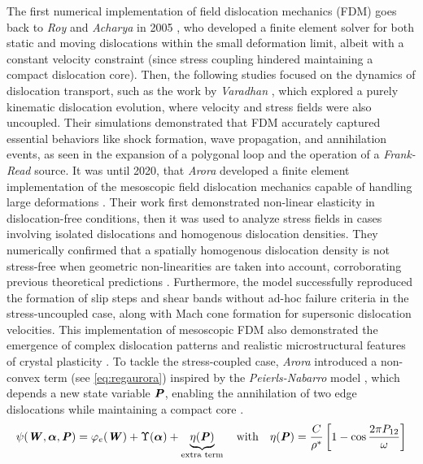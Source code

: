 \documentclass{article}
\begin{document}
The first numerical implementation of field dislocation mechanics (FDM) goes back to \emph{Roy} and \emph{Acharya} in 2005 \parencite{royFiniteelement2005}, who developed a finite element solver for both static and moving dislocations within the small deformation limit, albeit with a constant velocity constraint (since stress coupling hindered maintaining a compact dislocation core). Then, the following studies focused on the dynamics of dislocation transport, such as the work by \emph{Varadhan} \parencite{varadhanDislocationtransport2006}, which explored a purely kinematic dislocation evolution, where velocity and stress fields were also uncoupled. Their simulations demonstrated that FDM accurately captured essential behaviors like shock formation, wave propagation, and annihilation events, as seen in the expansion of a polygonal loop and the operation of a \emph{Frank-Read} source. It was until 2020, that \emph{Arora} developed a finite element implementation of the mesoscopic field dislocation mechanics capable of handling large deformations \parencite{aroraFiniteelement2020}. Their work first demonstrated non-linear elasticity in dislocation-free conditions, then it was used to analyze stress fields in cases involving isolated dislocations and homogenous dislocation densities. They numerically confirmed that a spatially homogenous dislocation density is not stress-free when geometric non-linearities are taken into account, corroborating previous theoretical predictions \parencite{acharyaStressspatially2018}. Furthermore, the model successfully reproduced the formation of slip steps and shear bands without ad-hoc failure criteria in the stress-uncoupled case, along with Mach cone formation for supersonic dislocation velocities. This implementation of mesoscopic FDM also demonstrated the emergence of complex dislocation patterns and realistic microstructural features of crystal plasticity \parencite{aroraDislocationpattern2020}. To tackle the stress-coupled case, \emph{Arora} introduced a non-convex term (see \cref{eq:regaurora}) inspired by the \emph{Peierls-Nabarro} model \parencite{nabarroDislocationssimple1947}, which depends a new state variable $\bm{\mathit{P}}$, enabling the annihilation of two edge dislocations while maintaining a compact core \parencite{aroraComputationalApproximation2019}. 
\begin{equation}\label{eq:regaurora}
    \psi(\bm{\mathit{W}}, \bm{\mathit{\alpha}}, \bm{\mathit{P}}) = \varphi_e(\bm{\mathit{W}}) + \Upsilon(\bm{\mathit{\alpha}}) +  \underbrace{\eta(\bm{\mathit{P}})}_{\text{extra term}} \quad \text{with} \quad \eta(\bm{\mathit{P}}) = \frac{C}{\rho^*} \left[ 1- \cos \frac{2 \pi P_{12}}{\omega}\right]
\end{equation}
\end{document}
